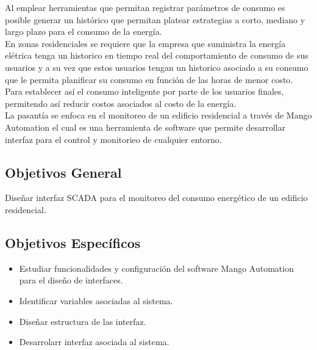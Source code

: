     Al emplear herramientas que permitan registrar parámetros de consumo es posible generar un histórico que permitan 
    platear estrategias a corto, mediano y largo plazo para el consumo de la energía.\\


    En zonas residenciales se requiere que la empresa que suministra la energía elétrica tenga un historico en tiempo real 
    del comportamiento de consumo de sus usuarios y a su vez que estos usuarios tengan un historico asociado a su consumo 
    que le permita planificar su consumo en función de las horas de menor costo. Para establecer así el consumo inteligente 
    por parte de los usuarios finales, permitendo así reducir costos asociados al costo de la energía.\\
        
    La pasantía se enfoca en el monitoreo de un edificio residencial a través de Mango Automation el cual es una herramienta
    de software que permite desarrollar interfaz para el control y monitorieo de cualquier entorno.

\subsection{Objetivos General}
    Diseñar interfaz SCADA para el 
    monitoreo del consumo energético de un 
    edificio residencial.

\subsection{Objetivos Específicos}
\begin{itemize}
    \item Estudiar funcionalidades y configuración
    del software Mango Automation para el diseño de 
    interfaces.
    \item Identificar variables asociadas al sistema.
    \item Diseñar estructura de las interfaz.
    \item Desarrolarr interfaz asociada al sistema.
\end{itemize}
\newpage